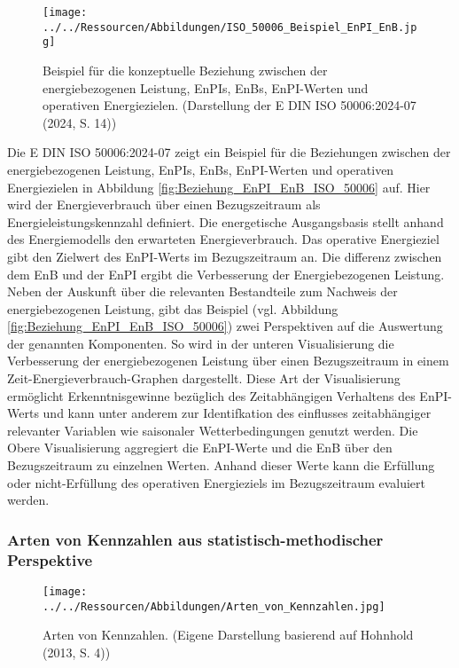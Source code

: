 \begin{figure}[H]
    \centering
    \texttt{[image: ../../Ressourcen/Abbildungen/ISO\_50006\_Beispiel\_EnPI\_EnB.jpg]}
    \caption{Beispiel für die konzeptuelle Beziehung zwischen der energiebezogenen Leistung, EnPIs, EnBs, EnPI-Werten und operativen Energiezielen. (Darstellung der E DIN ISO 50006:2024-07 (2024, S. 14))}
    \label{fig:Beziehung_EnPI_EnB_ISO_50006}
\end{figure}

Die E DIN ISO 50006:2024-07 zeigt ein Beispiel für die Beziehungen zwischen der energiebezogenen Leistung, EnPIs, EnBs, EnPI-Werten und operativen Energiezielen 
in Abbildung \eqref{fig:Beziehung_EnPI_EnB_ISO_50006} auf.
Hier wird der Energieverbrauch über einen Bezugszeitraum als Energieleistungskennzahl definiert.
Die energetische Ausgangsbasis stellt anhand des Energiemodells den erwarteten Energieverbrauch.
Das operative Energieziel gibt den Zielwert des EnPI-Werts im Bezugszeitraum an. 
Die differenz zwischen dem EnB und der EnPI ergibt die Verbesserung der Energiebezogenen Leistung.
Neben der Auskunft über die relevanten Bestandteile zum Nachweis der energiebezogenen Leistung, gibt das Beispiel (vgl. Abbildung \eqref{fig:Beziehung_EnPI_EnB_ISO_50006}) 
zwei Perspektiven auf die Auswertung der genannten Komponenten.
So wird in der unteren Visualisierung die Verbesserung der energiebezogenen Leistung über einen Bezugszeitraum in einem Zeit-Energieverbrauch-Graphen dargestellt.
Diese Art der Visualisierung ermöglicht Erkenntnisgewinne bezüglich des Zeitabhängigen Verhaltens des EnPI-Werts und kann unter anderem zur Identifkation des 
einflusses zeitabhängiger relevanter Variablen wie saisonaler Wetterbedingungen genutzt werden. 
Die Obere Visualisierung aggregiert die EnPI-Werte und die EnB über den Bezugszeitraum zu einzelnen Werten. 
Anhand dieser Werte kann die Erfüllung oder nicht-Erfüllung des operativen Energieziels im Bezugszeitraum evaluiert werden.

\subsubsection{Arten von Kennzahlen aus statistisch-methodischer Perspektive}

\begin{figure}[H]
    \centering
    \texttt{[image: ../../Ressourcen/Abbildungen/Arten\_von\_Kennzahlen.jpg]}
    \caption{Arten von Kennzahlen. (Eigene Darstellung basierend auf Hohnhold (2013, S. 4))}
    \label{fig:Arten_Kennzahlen}
\end{figure}

